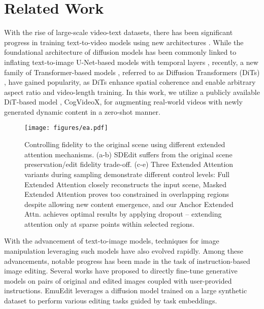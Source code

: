 \section{Related Work}
With the rise of large-scale video-text datasets, there has been significant progress in training text-to-video models using new architectures \cite{bartal2024lumiere, polyak2024movie}. While the foundational architecture of diffusion models has been commonly linked to inflating text-to-image U-Net-based models with temporal layers \cite{wang2023modelscope,zeroscope, guo2023animatediff}, recently, a new family of Transformer-based models \cite{sora, kong2025hunyuanvideosystematicframeworklarge, yang2024cogvideox, opensora, hacohen2024ltxvideorealtimevideolatent}, referred to as Diffusion Transformers (DiTs) \cite{dit}, have gained popularity, as DiTs enhance spatial coherence and enable arbitrary aspect ratio and video-length training. In this work, we utilize a publicly available DiT-based model \cite{yang2024cogvideox},  CogVideoX,  for augmenting real-world videos with newly generated dynamic content in a zero-shot manner. 

\begin{figure*}[h]
    \centering
    \texttt{[image: figures/ea.pdf]} \vspace{-0.8cm}
    \caption{Controlling fidelity to the original scene using different extended attention mechanisms. (a-b) SDEdit suffers from the original scene preservation/edit fidelity trade-off. (c-e) Three Extended Attention variants during sampling demonstrate different control levels: Full Extended Attention closely reconstructs the input scene, Masked Extended Attention proves too constrained in overlapping regions despite allowing new content emergence, and our Anchor Extended Attn. achieves optimal results by applying dropout -- extending attention only at sparse points within selected regions.}
    \label{fig:extended_attn}\afterfigure
\end{figure*}

With the advancement of text-to-image models, techniques for image manipulation leveraging such models have also evolved rapidly. Among these advancements, notable progress has been made in the task of instruction-based image editing. Several works \cite{hive,Sheynin2023EmuEP,brooks2022instructpix2pix,Zhang2023MagicBrush} have proposed to directly fine-tune generative models on pairs of original and edited images coupled with user-provided instructions. EmuEdit \cite{Sheynin2023EmuEP} leverages a diffusion model trained on a large synthetic dataset to perform various editing tasks guided by task embeddings.

